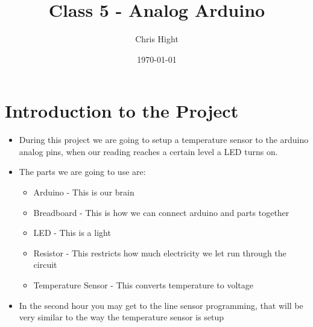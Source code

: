 \documentclass[12pt]{article}
\title{Class 5 - Analog Arduino}
\author{Chris Hight}
\date{\today}
\begin{document}
\maketitle


\section *{Introduction to the Project}
	\begin{itemize}
		\item During this project we are going to setup a temperature sensor to the arduino analog pins, when our reading reaches a certain level a LED turns on.

		\item The parts we are going to use are:
	
		\begin{itemize}
    		\item Arduino - This is our brain
    		\item Breadboard - This is how we can connect arduino and parts together
    		\item LED - This is a light
    		\item Resistor - This restricts how much electricity we let run through the circuit
    		\item Temperature Sensor - This converts temperature to voltage
		\end{itemize}
		
		\item In the second hour you may get to the line sensor programming, that will be very similar to the way the temperature sensor is setup
	
	\end{itemize}
\end{document}
